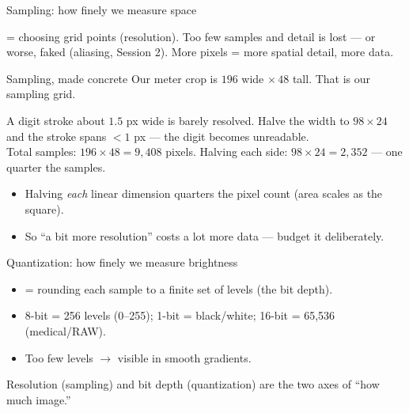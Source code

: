 \documentclass[10pt,aspectratio=169]{beamer}
\begin{document}
\begin{frame}{Sampling: how finely we measure space}
  \begin{center}
  \end{center}
   = choosing grid points (resolution). Too few samples and detail is lost —
  or worse, faked (aliasing, Session 2). More pixels = more spatial detail, more data.
\end{frame}

\begin{frame}{Sampling, made concrete}
  Our meter crop is $196$ wide $\times\,48$ tall. That is our sampling grid.
  \begin{mathbox}
    A digit stroke about \(1.5\) px wide is barely resolved. Halve the width to $98\times24$
    and the stroke spans $<1$ px — the digit becomes unreadable. \\[3pt]
    Total samples: \(196 \times 48 = 9{,}408\) pixels. Halving each side: \(98\times24 = 2{,}352\)
    — one quarter the samples.
  \end{mathbox}
  \begin{itemize}
    \item Halving \emph{each} linear dimension quarters the pixel count (area scales as the square).
    \item So ``a bit more resolution'' costs a lot more data — budget it deliberately.
  \end{itemize}
\end{frame}

\begin{frame}{Quantization: how finely we measure brightness}
  \begin{itemize}
    \item {} = rounding each sample to a finite set of levels (the bit depth).
    \item 8-bit = 256 levels (0--255); 1-bit = black/white; 16-bit = 65{,}536 (medical/RAW).
    \item Too few levels $\rightarrow$ visible  in smooth gradients.
  \end{itemize}
  \begin{infobox}
    Resolution (sampling) and bit depth (quantization) are the two axes of ``how much image.''
  \end{infobox}
\end{frame}
\end{document}
